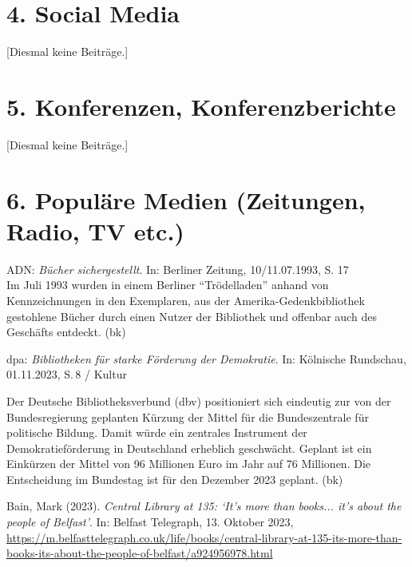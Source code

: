 \documentclass[a4paper,
fontsize=11pt,
oneside,
numbers=noperiodatend,
parskip=half-,
bibliography=totoc,
final
]{scrartcl}
\begin{document}
\hypertarget{social-media}{%
\section{4. Social Media}\label{social-media}}

{[}Diesmal keine Beiträge.{]}

\hypertarget{konferenzen-konferenzberichte}{%
\section{5. Konferenzen,
Konferenzberichte}\label{konferenzen-konferenzberichte}}

{[}Diesmal keine Beiträge.{]}

\hypertarget{populuxe4re-medien-zeitungen-radio-tv-etc.}{%
\section{6. Populäre Medien (Zeitungen, Radio, TV
etc.)}\label{populuxe4re-medien-zeitungen-radio-tv-etc.}}

ADN: \emph{Bücher sichergestellt}. In: Berliner Zeitung, 10/11.07.1993,
S. 17\\
Im Juli 1993 wurden in einem Berliner \enquote{Trödelladen} anhand von
Kennzeichnungen in den Exemplaren, aus der Amerika-Gedenkbibliothek
gestohlene Bücher durch einen Nutzer der Bibliothek und offenbar auch
des Geschäfts entdeckt. (bk)

dpa: \emph{Bibliotheken für starke Förderung der Demokratie}. In:
Kölnische Rundschau, 01.11.2023, S.\,8 / Kultur

Der Deutsche Bibliotheksverbund (dbv) positioniert sich eindeutig zur
von der Bundesregierung geplanten Kürzung der Mittel für die
Bundeszentrale für politische Bildung. Damit würde ein zentrales
Instrument der Demokratieförderung in Deutschland erheblich geschwächt.
Geplant ist ein Einkürzen der Mittel von 96 Millionen Euro im Jahr auf
76 Millionen. Die Entscheidung im Bundestag ist für den Dezember 2023
geplant. (bk)

Bain, Mark (2023). \emph{Central Library at 135: \enquote*{It's more
than books... it's about the people of Belfast}}. In: Belfast Telegraph,
13. Oktober 2023,
\url{https://m.belfasttelegraph.co.uk/life/books/central-library-at-135-its-more-than-books-its-about-the-people-of-belfast/a924956978.html}
\end{document}
